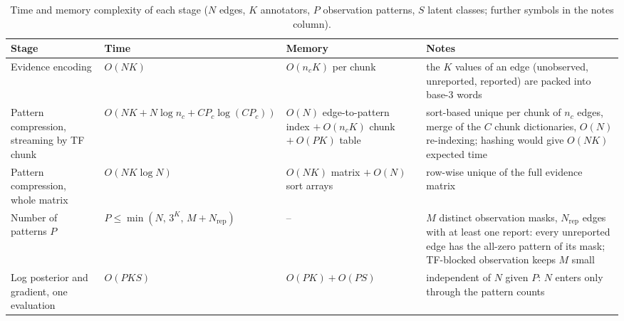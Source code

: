 \begin{table}[htbp]
\centering
\small
\setlength{\tabcolsep}{3pt}
\caption{Time and memory complexity of each stage ($N$ edges, $K$ annotators, $P$ observation patterns, $S$ latent classes; further symbols in the notes column).}
\label{tab:S-complexity}
\begin{tabular}{@{}p{2.8cm}p{3.2cm}p{3.3cm}p{4.6cm}@{}}
\toprule
Stage & Time & Memory & Notes \\
\midrule
\parbox[t]{2.8cm}{\raggedright Evidence encoding\strut} & \parbox[t]{3.2cm}{\raggedright\footnotesize $O(NK)$\strut} & \parbox[t]{3.3cm}{\raggedright\footnotesize $O(n_c K)$ per chunk\strut} & \parbox[t]{4.6cm}{\raggedright\scriptsize the $K$ values of an edge (unobserved, unreported, reported) are packed into base-3 words\strut} \\
\parbox[t]{2.8cm}{\raggedright Pattern compression, streaming by TF chunk\strut} & \parbox[t]{3.2cm}{\raggedright\footnotesize $O(NK + N\log n_c + C P_c\log(C P_c))$\strut} & \parbox[t]{3.3cm}{\raggedright\footnotesize $O(N)$ edge-to-pattern index $+\ O(n_c K)$ chunk $+\ O(PK)$ table\strut} & \parbox[t]{4.6cm}{\raggedright\scriptsize sort-based unique per chunk of $n_c$ edges, merge of the $C$ chunk dictionaries, $O(N)$ re-indexing; hashing would give $O(NK)$ expected time\strut} \\
\parbox[t]{2.8cm}{\raggedright Pattern compression, whole matrix\strut} & \parbox[t]{3.2cm}{\raggedright\footnotesize $O(NK\log N)$\strut} & \parbox[t]{3.3cm}{\raggedright\footnotesize $O(NK)$ matrix $+\ O(N)$ sort arrays\strut} & \parbox[t]{4.6cm}{\raggedright\scriptsize row-wise unique of the full evidence matrix\strut} \\
\parbox[t]{2.8cm}{\raggedright Number of patterns $P$\strut} & \parbox[t]{3.2cm}{\raggedright\footnotesize $P\leq\min(N,\,3^K,\,M+N_{\mathrm{rep}})$\strut} & \parbox[t]{3.3cm}{\raggedright\footnotesize --\strut} & \parbox[t]{4.6cm}{\raggedright\scriptsize $M$ distinct observation masks, $N_{\mathrm{rep}}$ edges with at least one report: every unreported edge has the all-zero pattern of its mask; TF-blocked observation keeps $M$ small\strut} \\
\parbox[t]{2.8cm}{\raggedright Log posterior and gradient, one evaluation\strut} & \parbox[t]{3.2cm}{\raggedright\footnotesize $O(PKS)$\strut} & \parbox[t]{3.3cm}{\raggedright\footnotesize $O(PK)+O(PS)$\strut} & \parbox[t]{4.6cm}{\raggedright\scriptsize independent of $N$ given $P$: $N$ enters only through the pattern counts\strut} \\

\end{tabular}
\end{table}

